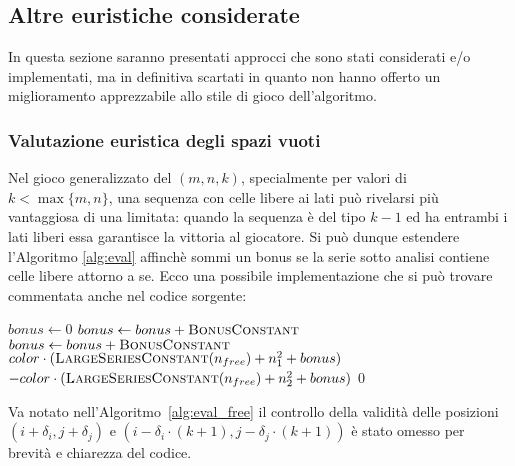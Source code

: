 \documentclass{article}
\begin{document}
\subsection*{Altre euristiche considerate}

In questa sezione saranno presentati approcci che sono stati considerati
e/o implementati, ma in definitiva scartati in quanto non hanno offerto un
miglioramento apprezzabile allo stile di gioco dell'algoritmo.

\subsubsection*{Valutazione euristica degli spazi vuoti}

Nel gioco generalizzato del $(m, n, k)$, specialmente per valori di $k < \max\{m,n\}$,
una sequenza con celle libere ai lati pu\`o rivelarsi pi\`u vantaggiosa di una
limitata: quando la sequenza \`e del tipo $k-1$ ed ha entrambi i lati liberi
essa garantisce la vittoria al giocatore. Si pu\`o dunque estendere l'Algoritmo
\vref{alg:eval} affinch\`e sommi un bonus se la serie sotto analisi contiene celle
libere attorno a se. Ecco una possibile implementazione che si pu\`o trovare
commentata anche nel codice sorgente:

\begin{algorithm}
  \caption{Valutazione delle serie favorendo spazi liberi adiacenti}
  \label{alg:eval_free}
  \begin{algorithmic}[0]
    \State $bonus \gets 0$
      \State $bonus \gets bonus + \textsc{BonusConstant}$
    \EndIf
      \State $bonus \gets bonus + \textsc{BonusConstant}$
    \EndIf
    \Statex
      \State \Return $color \cdot (\Call{LargeSeriesConstant}{n_{free}} + n_1^2 + bonus)$
    \State \Return $-color \cdot (\Call{LargeSeriesConstant}{n_{free}} + n_2^2 + bonus)$
    \Else
      \State \Return $0$
    \EndIf
    \EndProcedure
  \end{algorithmic}
\end{algorithm}

Va notato nell'Algoritmo~\ref{alg:eval_free} il controllo della validit\`a delle
posizioni $(i + \delta_i, j + \delta_j)$ e $(i - \delta_i \cdot (k+1), j - \delta_j \cdot (k+1))$
\`e stato omesso per brevit\`a e chiarezza del codice.
\end{document}
